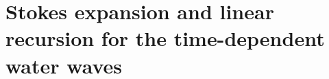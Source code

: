\documentclass[11pt]{article}
\theoremstyle{plain}
\theoremstyle{definition}
\theoremstyle{definition}
\def\D{{\mathcal D}}
\def\bfn{{\mathbf n}}
\def\bfn{\text{\bf\emph{n}}}
\def\p{\text{\bf\emph{p}}}
\def\bp{{\partial_1}}
\def\p{{\partial\hspace{1pt}}}
\begin{document}
%

\section{Stokes expansion and linear recursion for the time-dependent water waves}\label{sec:stokes_expansion}
\end{document}
